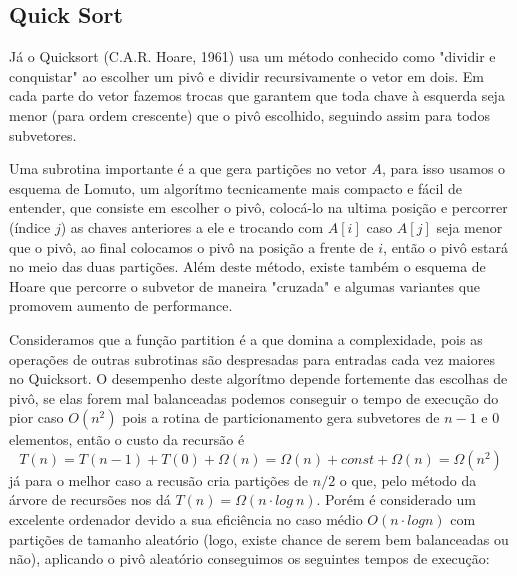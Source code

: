 \documentclass{article}
\begin{document}
\subsection{Quick Sort}
Já o Quicksort (C.A.R. Hoare, 1961) usa um método conhecido como "dividir e conquistar" ao escolher um pivô e dividir recursivamente o vetor em dois. Em cada parte do vetor fazemos trocas que garantem que toda chave à esquerda seja menor (para ordem crescente) que o pivô escolhido, seguindo assim para todos subvetores.\par
%
Uma subrotina importante é a que gera partições no vetor $A$, para isso usamos o esquema de Lomuto, um algorítmo tecnicamente mais compacto e fácil de entender, que consiste em escolher o pivô, colocá-lo na ultima posição e percorrer (índice $j$) as chaves anteriores a ele e trocando com $A[i]$ caso $A[j]$ seja menor que o pivô, ao final colocamos o pivô na posição a frente de $i$, então o pivô estará no meio das duas partições. Além deste método, existe também o esquema de Hoare que percorre o subvetor de maneira "cruzada" e algumas variantes que promovem aumento de performance.\par
%
Consideramos que a função partition é a que domina a complexidade, pois as operações de outras subrotinas são despresadas para entradas cada vez maiores no Quicksort. O desempenho deste algorítmo depende fortemente das escolhas de pivô, se elas forem mal balanceadas podemos conseguir o tempo de execução do pior caso $O(n^2)$ pois a rotina de particionamento gera subvetores de $n-1$ e $0$ elementos, então o custo da recursão é \[T(n) = T(n-1) + T(0) + \Omega(n) = \Omega(n) + const + \Omega(n) = \Omega(n^2)\] já para o melhor caso a recusão cria partições de $n/2$ o que, pelo método da árvore de recursões nos dá $T(n) = \Omega(n\cdot log\ n)$. Porém é considerado um excelente ordenador devido a sua eficiência no caso médio $O(n\cdot log n)$ com partições de tamanho aleatório (logo, existe chance de serem bem balanceadas ou não), aplicando o pivô aleatório conseguimos os seguintes tempos de execução: \par
\end{document}
